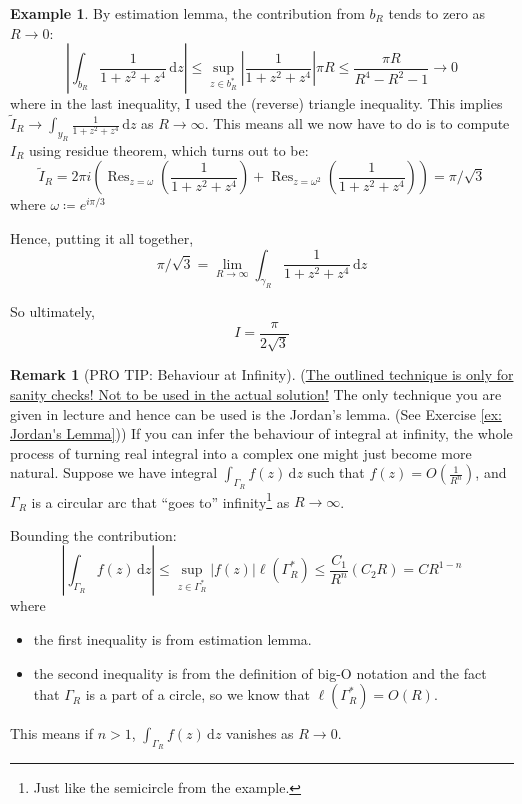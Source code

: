 \documentclass[a4paper, 12pt]{article}
\theoremstyle{definition}
\newtheorem{example}{Example}
\newtheorem{remark}{Remark}
\numberwithin{theorem}{section}
\numberwithin{definition}{section}
\numberwithin{exercise}{section}
\numberwithin{remark}{section}
\numberwithin{figure}{section}
\numberwithin{example}{section}
\newcommand{\intd}{\,\text{d}}
\DeclareMathOperator{\res}{Res}
\begin{document}
\begin{example}
    By estimation lemma, the contribution from $b_R$ tends to zero as $R \rightarrow 0$:
    \begin{equation*}
        \left| \int_{b_R} \frac{1}{1+z^2+z^4} \intd z \right|
        \leq \sup_{z \in b_R^*} \left|\frac{1}{1+z^2+z^4}\right| \pi R
        \leq \frac{\pi R}{R^4 - R^2 - 1} \rightarrow 0
    \end{equation*}
    where in the last inequality, I used the (reverse) triangle inequality.
    This implies $\tilde I_R \rightarrow \int_{y_R} \frac{1}{1+z^2+z^4}\intd z$ as $R \rightarrow \infty$.
    This means all we now have to do is to compute $I_R$ using residue theorem, which turns out to be:
    \begin{equation*}
        \tilde I_R = 2 \pi i \left( \res_{z=\omega} \left( \frac{1}{1+z^2+z^4} \right) + \res_{z=\omega^2} \left( \frac{1}{1+z^2+z^4} \right) \right)
        = \pi/\sqrt{3}
    \end{equation*}
    where $\omega\coloneqq e^{i\pi/3}$ 

    Hence, putting it all together,
    \begin{equation*}
        \pi/\sqrt{3} = \lim_{R\rightarrow\infty}\int_{\gamma_R}\frac{1}{1+z^2+z^4} \intd z
    \end{equation*}

    So ultimately,
    \begin{equation*}
        I = \frac{\pi}{2\sqrt{3}}
    \end{equation*}
\end{example}
\begin{remark}[PRO TIP: Behaviour at Infinity]
    \label{rmk: PRO TIP: Behaviour at Infinity}
    (\ul{The outlined technique is only for sanity checks!
    Not to be used in the actual solution!}
The only technique you are given in lecture and hence can be used is the Jordan's lemma. (See Exercise \ref{ex: Jordan's Lemma}))
    If you can infer the behaviour of integral at infinity,
    the whole process of turning real integral into a complex one
    might just become more natural.
    Suppose we have integral $\int_{\Gamma_R} f(z) \intd z$
    such that $f(z) = O\left( \frac{1}{R^n} \right)$,
    and $\Gamma_R$ is a circular arc that ``goes to'' infinity\footnote{Just like the semicircle from the example.} as $R \rightarrow \infty$.

    Bounding the contribution:
    \begin{equation*}
        \left|\int_{\Gamma_R} f(z) \intd z \right|
        \leq \sup_{z \in \Gamma_R^*} |f(z)| \ell(\Gamma_R^*)
        \leq \frac{C_1}{R^n} \left(C_2 R\right)
        =C R^{1-n}
    \end{equation*}
    where
    \begin{itemize}
        \item the first inequality is from estimation lemma.
        \item the second inequality is from the definition of big-O notation and the fact that $\Gamma_R$ is a part of a circle, so we know that $\ell\left( \Gamma_R^* \right) = O\left( R \right)$.
    \end{itemize}
    This means if $n>1$, $\int_{\Gamma_R} f(z) \intd z$ vanishes as $R \rightarrow 0$.
\end{remark}
\end{document}
